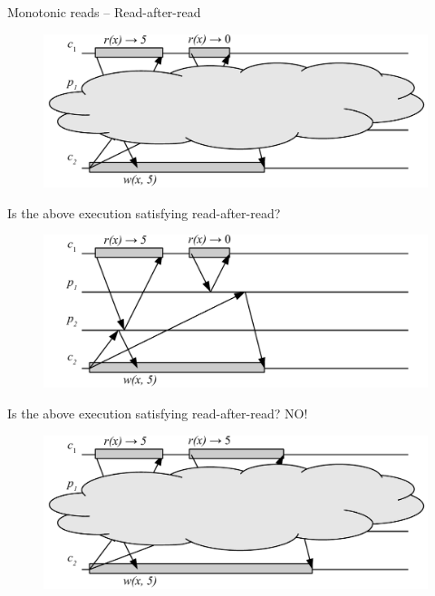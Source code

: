 \begin{frame}{Monotonic reads -- Read-after-read}

\begin{overprint}
\begin{figure}
	\includegraphics[width=\textwidth]{figs/09/read-after-read-01}
\end{figure}
\BI
\item Is the above execution satisfying read-after-read?
\EI
{}
\begin{figure}
	\includegraphics[width=\textwidth]{figs/09/read-after-read-01n}
\end{figure}
\BI
\item Is the above execution satisfying read-after-read? \quad NO!
\EI
{}
\begin{figure}
	\includegraphics[width=\textwidth]{figs/09/read-after-read-02}

\end{figure}
\end{overprint}
\end{frame}

